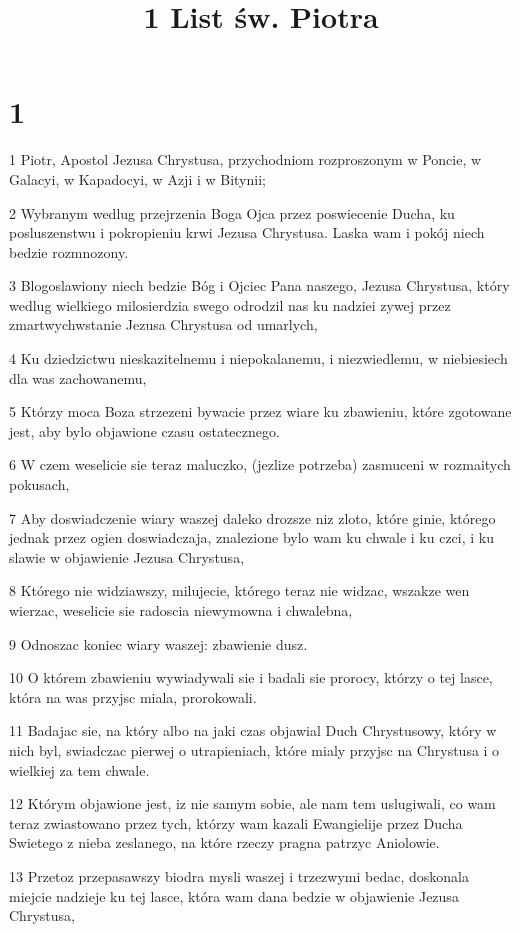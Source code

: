 

\title{1 List św. Piotra}


\chapter{1}

\par 1 Piotr, Apostol Jezusa Chrystusa, przychodniom rozproszonym w Poncie, w Galacyi, w Kapadocyi, w Azji i w Bitynii;
\par 2 Wybranym wedlug przejrzenia Boga Ojca przez poswiecenie Ducha, ku posluszenstwu i pokropieniu krwi Jezusa Chrystusa. Laska wam i pokój niech bedzie rozmnozony.
\par 3 Blogoslawiony niech bedzie Bóg i Ojciec Pana naszego, Jezusa Chrystusa, który wedlug wielkiego milosierdzia swego odrodzil nas ku nadziei zywej przez zmartwychwstanie Jezusa Chrystusa od umarlych,
\par 4 Ku dziedzictwu nieskazitelnemu i niepokalanemu, i niezwiedlemu, w niebiesiech dla was zachowanemu,
\par 5 Którzy moca Boza strzezeni bywacie przez wiare ku zbawieniu, które zgotowane jest, aby bylo objawione czasu ostatecznego.
\par 6 W czem weselicie sie teraz maluczko, (jezlize potrzeba) zasmuceni w rozmaitych pokusach,
\par 7 Aby doswiadczenie wiary waszej daleko drozsze niz zloto, które ginie, którego jednak przez ogien doswiadczaja, znalezione bylo wam ku chwale i ku czci, i ku slawie w objawienie Jezusa Chrystusa,
\par 8 Którego nie widziawszy, milujecie, którego teraz nie widzac, wszakze wen wierzac, weselicie sie radoscia niewymowna i chwalebna,
\par 9 Odnoszac koniec wiary waszej: zbawienie dusz.
\par 10 O którem zbawieniu wywiadywali sie i badali sie prorocy, którzy o tej lasce, która na was przyjsc miala, prorokowali.
\par 11 Badajac sie, na który albo na jaki czas objawial Duch Chrystusowy, który w nich byl, swiadczac pierwej o utrapieniach, które mialy przyjsc na Chrystusa i o wielkiej za tem chwale.
\par 12 Którym objawione jest, iz nie samym sobie, ale nam tem uslugiwali, co wam teraz zwiastowano przez tych, którzy wam kazali Ewangielije przez Ducha Swietego z nieba zeslanego, na które rzeczy pragna patrzyc Aniolowie.
\par 13 Przetoz przepasawszy biodra mysli waszej i trzezwymi bedac, doskonala miejcie nadzieje ku tej lasce, która wam dana bedzie w objawienie Jezusa Chrystusa,
